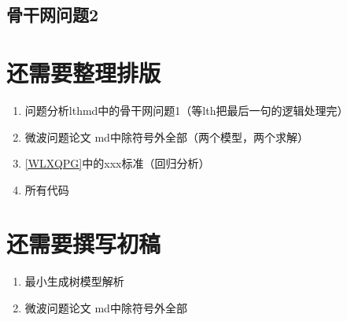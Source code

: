 \documentclass[UTF8,12pt]{ctexart}
\begin{document}
    \subsection{骨干网问题2}

    \newpage
\section{还需要整理排版}
    \begin{enumerate}
        \item 问题分析lthmd中的骨干网问题1（等lth把最后一句的逻辑处理完）
        \item 微波问题论文 md中除符号外全部（两个模型，两个求解）
        \item \ref{WLXQPG}中的xxx标准（回归分析）
        \item 所有代码
    \end{enumerate}
\section{还需要撰写初稿}
    \begin{enumerate}
        \item 最小生成树模型解析
        \item 微波问题论文 md中除符号外全部
    \end{enumerate}
        \newpage
\end{document}

